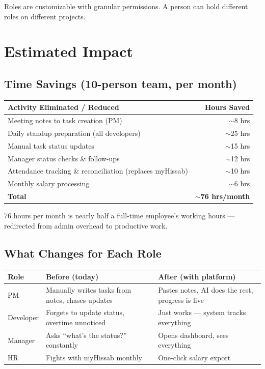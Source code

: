 \documentclass[12pt,a4paper]{article}
\begin{document}
Roles are customizable with granular permissions. A person can hold different roles on different projects.

\section{Estimated Impact}

\subsection{Time Savings (10-person team, per month)}

\begin{center}
\renewcommand{\arraystretch}{1.4}
\begin{tabularx}{\textwidth}{X r}
    \toprule
    \textbf{Activity Eliminated / Reduced} & \textbf{Hours Saved} \\
    \midrule
    Meeting notes to task creation (PM) & $\sim$8 hrs \\
    Daily standup preparation (all developers) & $\sim$25 hrs \\
    Manual task status updates & $\sim$15 hrs \\
    Manager status checks \& follow-ups & $\sim$12 hrs \\
    Attendance tracking \& reconciliation (replaces myHissab) & $\sim$10 hrs \\
    Monthly salary processing & $\sim$6 hrs \\
    \midrule
    \textbf{Total} & \textbf{$\sim$76 hrs/month} \\
    \bottomrule
\end{tabularx}
\end{center}

76 hours per month is nearly half a full-time employee's working hours --- redirected from admin overhead to productive work.

\subsection{What Changes for Each Role}

\begin{center}
\renewcommand{\arraystretch}{1.4}
\begin{tabularx}{\textwidth}{l X X}
    \toprule
    \textbf{Role} & \textbf{Before (today)} & \textbf{After (with platform)} \\
    \midrule
    PM & Manually writes tasks from notes, chases updates & Pastes notes, AI does the rest, progress is live \\
    Developer & Forgets to update status, overtime unnoticed & Just works --- system tracks everything \\
    Manager & Asks ``what's the status?'' constantly & Opens dashboard, sees everything \\
    HR & Fights with myHissab monthly & One-click salary export \\
    \bottomrule
\end{tabularx}
\end{center}
\end{document}

